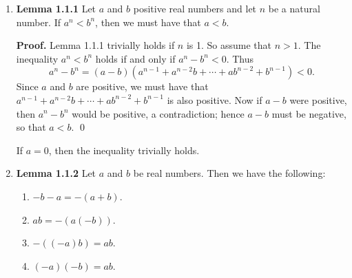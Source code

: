 \begin{enumerate}
   \item[]        \textbf{Lemma 1.1.1} Let $a$ and $b$ positive real numbers and
                  let $n$ be a natural number. If $a^n < b^n$, then we must have 
                  that $a < b$.
   
      \textbf{Proof.} Lemma 1.1.1 trivially holds if $n$ is 1. So assume that
      $n > 1$. The inequality $a^n < b^n$ holds if and only if $a^n - b^n < 0$. 
      Thus
      $$a^n - b^n = (a - b)(a^{n-1} + a^{n-2}b + \cdots + ab^{n-2} + b^{n-1})
                  < 0.$$
      Since $a$ and $b$ are positive, we must have that
      $a^{n-1} + a^{n-2}b + \cdots + ab^{n-2} + b^{n-1}$ is also
      positive. Now if $a - b$ were positive, then $a^n- b^n$ would be positive,
      a contradiction; hence $a - b$ must be negative, so that $a < b$. \qed

      If $a = 0$, then the inequality trivially holds.

   \item[]        \textbf{Lemma 1.1.2} Let $a$ and $b$ be real numbers. Then we
                  have the following:
                  \begin{enumerate}
                     \item $-b - a = -(a + b)$.
                     \item $ab = -(a(-b))$.
                     \item $-((-a)b) = ab$.
                     \item $(-a)(-b) = ab$.
                  \end{enumerate}
   

\end{enumerate}
